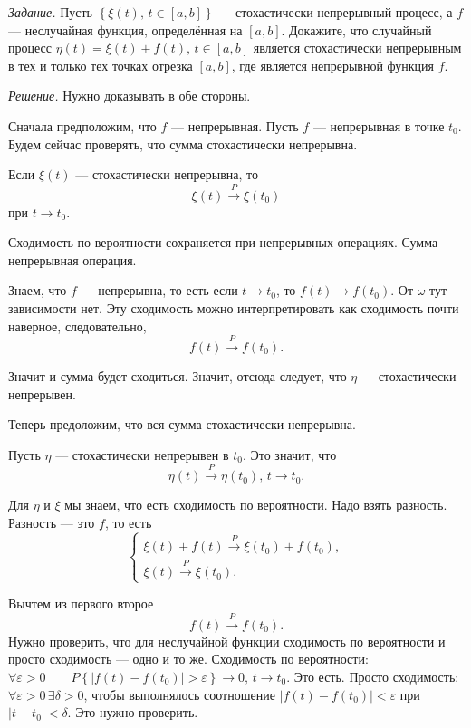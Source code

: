 \textit{Задание.}
Пусть $ \left\{ \xi \left( t \right), \, t \in \left[ a, b \right] \right\} $ ---
стохастически непрерывный процесс, а $f$ --- неслучайная функция,
определённая на $ \left[ a, b \right] $.
Докажите, что случайный процесс
$ \eta \left( t \right) =
  \xi \left( t \right) + f \left( t \right), \, t \in \left[ a, b \right] $
является стохастически непрерывным в тех и только тех точках отрезка $ \left[ a, b \right] $,
где является непрерывной функция $f$.

\textit{Решение.}
Нужно доказывать в обе стороны.

Сначала предположим, что $f$ --- непрерывная.
Пусть $f$ --- непрерывная в точке $t_0$.
Будем сейчас проверять, что сумма стохастически непрерывна.

Если $ \xi \left( t \right) $ --- стохастически непрерывна, то
$$ \xi \left( t \right) \overset{P}{ \to }
  \xi \left( t_0 \right)$$
при $t \to t_0$.

Сходимость по вероятности сохраняется при непрерывных операциях.
Сумма --- непрерывная операция.

Знаем, что $f$ --- непрерывна, то есть если $t \to t_0$,
то $f \left( t \right) \to f \left( t_0 \right) $.
От $ \omega $ тут зависимости нет.
Эту сходимость можно интерпретировать как сходимость почти наверное, следовательно,
$$f \left( t \right) \overset{P}{ \to }
  f \left( t_0 \right).$$

Значит и сумма будет сходиться.
Значит, отсюда следует, что $ \eta $ --- стохастически непрерывен.

Теперь предоложим, что вся сумма стохастически непрерывна.

Пусть $ \eta $ --- стохастически непрерывен в $t_0$.
Это значит, что
$$ \eta \left( t \right) \overset{P}{ \to } \eta \left( t_0 \right), \,
  t \to t_0.$$

Для $ \eta $ и $ \xi $ мы знаем, что есть сходимость по вероятности.
Надо взять разность.
Разность --- это $f$, то есть
$$ \begin{cases}
    \xi \left( t \right) + f \left( t \right) \overset{P}{ \to }
    \xi \left( t_0 \right) + f \left( t_0 \right), \\
    \xi \left( t \right) \overset{P}{ \to } \xi \left( t_0 \right).
  \end{cases}$$

Вычтем из первого второе
$$f \left( t \right) \overset{P}{ \to }
  f \left( t_0 \right).$$
Нужно проверить, что для неслучайной функции сходимость по вероятности и просто сходимость ---
одно и то же.
Сходимость по вероятности:
$ \forall \varepsilon > 0 \qquad
  P \left\{ \left| f \left( t \right) - f \left( t_0 \right) \right| > \varepsilon \right\} \to 0,
  \, t \to t_0$.
Это есть.
Просто сходимость: $ \forall \varepsilon > 0 \, \exists \delta > 0$,
чтобы выполнялось соотношение
$ \left| f \left( t \right) - f \left( t_0 \right) \right| <
  \varepsilon $
при $ \left| t - t_0 \right| < \delta $.
Это нужно проверить.

